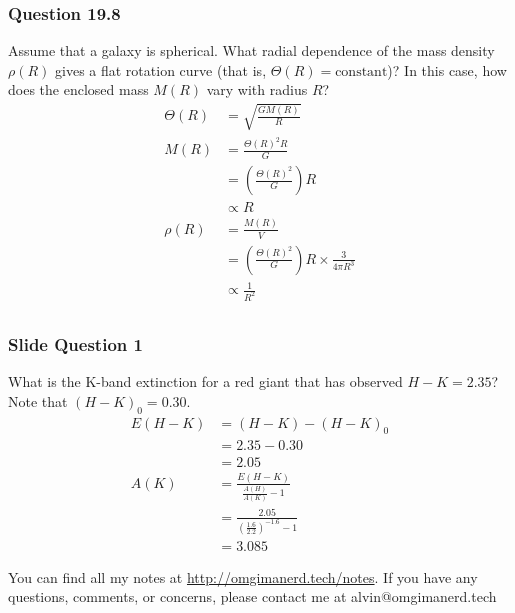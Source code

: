 \documentclass{math}
\begin{document}
\subsubsection*{Question 19.8}
Assume that a galaxy is spherical. What radial dependence of the mass density
\( \rho(R) \) gives a flat rotation curve (that is, \( \Theta(R) =
\text{constant} \))? In this case, how does the enclosed mass \( M(R) \) vary
with radius \( R \)?
\begin{align*}
  \Theta(R) &= \sqrt{\frac{GM(R)}{R}} \\
  M(R) &= \frac{\Theta(R)^2R}{G} \\
  &= \left(\frac{\Theta(R)^2}{G}\right)R \\
  &\propto R \\
  \rho(R) &= \frac{M(R)}{V} \\
  &= \left(\frac{\Theta(R)^2}{G}\right)R\times\frac{3}{4\pi R^3} \\
  &\propto \frac{1}{R^2} \\
\end{align*}

\subsubsection*{Slide Question 1}
What is the K-band extinction for a red giant that has observed
\( H-K = 2.35 \)? Note that \( (H-K)_0 = 0.30 \).
\begin{align*}
  E(H-K) &= (H-K)-(H-K)_0 \\
  &= 2.35-0.30 \\
  &= 2.05 \\
  A(K) &= \frac{E(H-K)}{\frac{A(H)}{A(K)}-1} \\
  &= \frac{2.05}{(\frac{1.6}{2.2})^{-1.6}-1} \\
  &= 3.085
\end{align*}

\begin{center}
  You can find all my notes at \url{http://omgimanerd.tech/notes}. If you have
  any questions, comments, or concerns, please contact me at
  alvin@omgimanerd.tech
\end{center}
\end{document}
